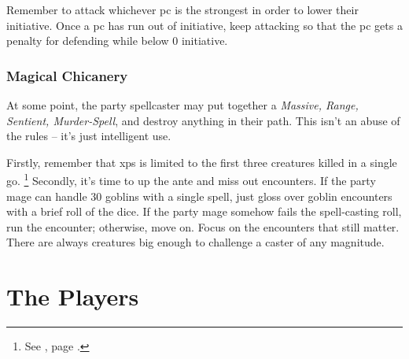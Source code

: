 \begin{multicols}{2}
Remember to attack whichever \gls{pc} is the strongest in order to lower their initiative.
Once a \gls{pc} has run out of initiative, keep attacking so that the \gls{pc} gets a penalty for defending while below 0 initiative.

\subsubsection{Magical Chicanery}

At some point, the party spellcaster may put together a \textit{Massive, Range, Sentient, Murder-Spell}, and destroy anything in their path.
This isn't an abuse of the rules -- it's just intelligent use.

Firstly, remember that \glspl{xp} is limited to the first three creatures killed in a single go.%
\footnote{See , page \pageref{xpCreatureMax}.}
Secondly, it's time to up the ante and miss out encounters.
If the party mage can handle 30 goblins with a single spell, just gloss over goblin encounters with a brief roll of the dice.
If the party mage somehow fails the spell-casting roll, run the encounter; otherwise, move on.
Focus on the encounters that still matter.
There are always creatures big enough to challenge a caster of any magnitude.

\end{multicols}

\section{The Players}

